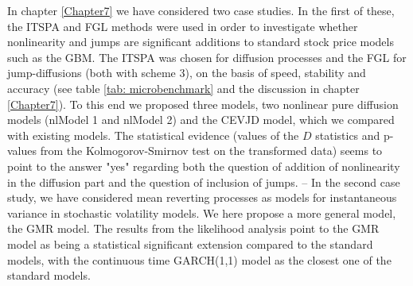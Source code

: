 In chapter \ref{Chapter7} we have considered two case studies.
In the first of these, the ITSPA and FGL methods were used in order to investigate whether nonlinearity and jumps are significant additions to standard stock price models such as the GBM.
The ITSPA was chosen for diffusion processes and the FGL for jump-diffusions (both with scheme 3), on the basis of speed, stability and accuracy (see table \ref{tab: microbenchmark} and the discussion in chapter \ref{Chapter7}).
To this end we proposed three models, two nonlinear pure diffusion models (nlModel 1 and nlModel 2) and the CEVJD model, which we compared with existing models.
The statistical evidence (values of the $D$ statistics and p-values from the Kolmogorov-Smirnov test on the transformed data) seems to point to the answer "yes" regarding both the question of addition of nonlinearity in the diffusion part and the question of inclusion of jumps.
--
In the second case study, we have considered mean reverting processes as models for instantaneous variance in stochastic volatility models.
We here propose a more general model, the GMR model.
The results from the likelihood analysis point to the GMR model as being a statistical significant extension compared to the standard models, with the continuous time GARCH(1,1) model as the closest one of the standard models.

